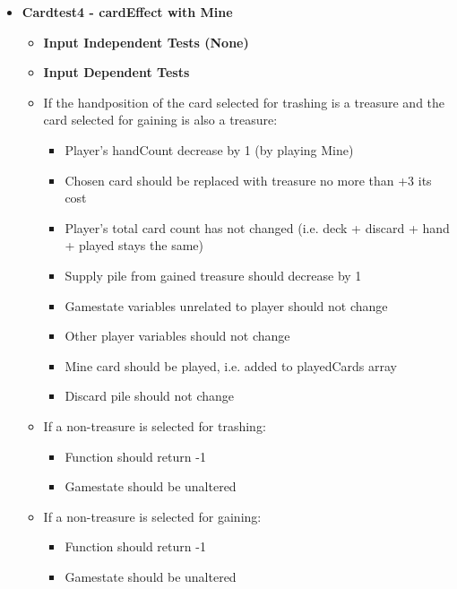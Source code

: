 \documentclass[11pt,letterpaper]{article}
\begin{document}
\begin{enumerate}[label=\Roman*.]
\begin{itemize}[leftmargin=*]
      \item \textbf{Cardtest4 - cardEffect with Mine}
        \begin{itemize}[leftmargin=*, label={}]
          \item \textbf{Input Independent Tests (None)}
          \item \textbf{Input Dependent Tests}
          \item If the handposition of the card selected for trashing is a treasure and the card selected for gaining is also a treasure: 
            \begin{itemize}[leftmargin=*]
              \item Player's handCount decrease by 1 (by playing Mine)
              \item Chosen card should be replaced with treasure no more than +3 its cost
              \item Player's total card count has not changed (i.e. deck + discard + hand + played stays the same)
              \item Supply pile from gained treasure should decrease by 1
              \item Gamestate variables unrelated to player should not change 
              \item Other player variables should not change
              \item Mine card should be played, i.e. added to playedCards array
              \item Discard pile should not change
            \end{itemize}
          \item If a non-treasure is selected for trashing:
            \begin{itemize}[leftmargin=*]
              \item Function should return -1
              \item Gamestate should be unaltered
            \end{itemize}
          \item If a non-treasure is selected for gaining:
            \begin{itemize}[leftmargin=*]
              \item Function should return -1
              \item Gamestate should be unaltered
            \end{itemize}
        \end{itemize}
    \end{itemize}


\end{enumerate}
\end{document}
